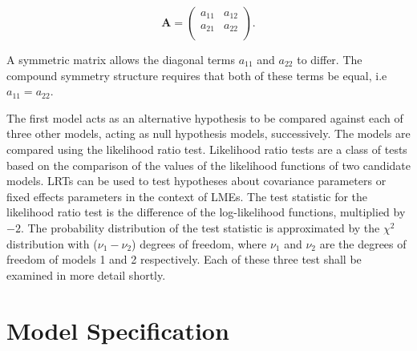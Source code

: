 \documentclass[12pt, a4paper]{report}
\theoremstyle{plain}
\theoremstyle{definition}
\theoremstyle{remark}
\begin{document}
	\[
	\boldsymbol{A} = \left( \begin{array}{cc}
	a_{11} & a_{12}  \\
	a_{21} & a_{22}  \\
	\end{array}\right).
	\]
	
	A symmetric matrix allows the diagonal terms $a_{11}$ and $a_{22}$ to differ. The compound symmetry structure requires that both of these terms be equal, i.e $a_{11} = a_{22}$.
	
	The first model acts as an alternative hypothesis to be compared against each of three other models, acting as null hypothesis models, successively. The models are compared using the likelihood ratio test. Likelihood ratio tests are a class of tests based on the comparison of the values of the likelihood functions of two candidate models. LRTs can be used to test hypotheses about covariance parameters or fixed effects parameters in the context of LMEs. The test statistic for the likelihood ratio test is the difference of the log-likelihood functions, multiplied by $-2$.
	The probability distribution of the test statistic is approximated by the $\chi^2$ distribution with ($\nu_{1} - \nu_{2}$) degrees of freedom, where $\nu_{1}$ and $\nu_{2}$ are the degrees of freedom of models 1 and 2 respectively. Each of these three test shall be examined in more detail shortly.
	

	

\chapter{Model Specification}
\end{document}
